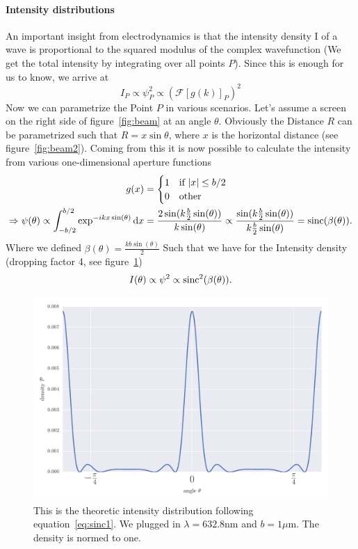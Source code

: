 \paragraph{Intensity distributions}An important insight from electrodynamics is that the intensity density I of a
wave is proportional to the squared modulus of the complex wavefunction (We get the total intensity by
integrating over all points $P$).
Since this is enough for us to
know, we arrive at
\begin{equation}
    I_P \propto \psi_P^2 \propto \left ( \mathcal{F} \left[g(k)\right ]_P \right )^2 
\end{equation}
Now we can parametrize the Point $P$ in various scenarios. Let's assume a screen on the right side of
figure~\ref{fig:beam} at an angle $\theta$. Obviously the Distance $R$ can be parametrized such that
$R = x \sin \theta $, where $x$ is the horizontal distance (see figure~\ref{fig:beam2}).
Coming from this it is now possible to calculate the intensity from various one-dimensional aperture
functions
\begin{align}
    \label{eq:g1}
    g(x) &= 
    \begin{cases}
        1 & \text{if } |x| \leq b/2 \\ 
        0 & \text{other }
    \end{cases} \\
    \Rightarrow \psi(\theta) \propto
    \int_{-b/2}^{b/2} \exp ^{-i k x \sin(\theta)} \mathrm{d} x
    &= \frac{2\sin ( k \frac{b}{2} \sin ( \theta ))}{k \sin(\theta)} \propto
    \frac{\sin ( k \frac{b}{2} \sin ( \theta ))}{k \frac{b}{2}  \sin(\theta)} 
    = \mathrm{sinc}(\beta(\theta)).
\end{align}
Where we defined $\beta(\theta) = \frac{kb \sin(\theta)}{2} $
Such that we have for the Intensity density (dropping factor 4, see figure~\ref{fig:sinc1})
\begin{equation}
    \label{eq:sinc1}
    I(\theta) \propto \psi^2 \propto \mathrm{sinc}^2(\beta(\theta)).
\end{equation}
\begin{figure}[htpb]
    \centering
    \includegraphics[width=0.8\linewidth]{figures/sinc1}
    \caption{This is the theoretic intensity distribution following equation~\eqref{eq:sinc1}. 
        We plugged in $\lambda = 632.8$nm and $b = 1 \mu$m. The density is normed to one.}
    \label{fig:sinc1}
\end{figure}
